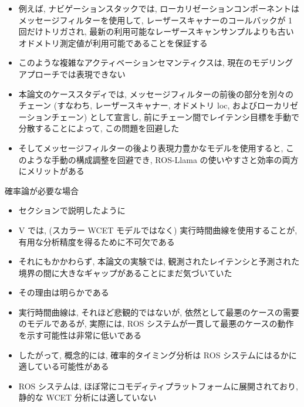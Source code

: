 \begin{frame}{}
    \begin{itemize}
        \item 例えば, ナビゲーションスタックでは, ローカリゼーションコンポーネントはメッセージフィルターを使用して, レーザースキャナーのコールバックが 1 回だけトリガされ, 最新の利用可能なレーザースキャンサンプルよりも古いオドメトリ測定値が利用可能であることを保証する
\item このような複雑なアクティベーションセマンティクスは, 現在のモデリングアプローチでは表現できない
\item 本論文のケーススタディでは, メッセージフィルターの前後の部分を別々のチェーン (すなわち, レーザースキャナー, オドメトリ loc, およびローカリゼーションチェーン) として宣言し, 前にチェーン間でレイテンシ目標を手動で分散することによって, この問題を回避した
\item そしてメッセージフィルターの後より表現力豊かなモデルを使用すると, このような手動の構成調整を回避でき, ROS-Llama の使いやすさと効率の両方にメリットがある
    \end{itemize}
\end{frame}

\begin{frame}{確率論が必要な場合}
    \begin{itemize}
        \item セクションで説明したように
\item V では, (スカラー WCET モデルではなく) 実行時間曲線を使用することが, 有用な分析精度を得るために不可欠である
\item それにもかかわらず, 本論文の実験では, 観測されたレイテンシと予測された境界の間に大きなギャップがあることにまだ気づいていた
    \end{itemize}
\end{frame}

\begin{frame}{}
    \begin{itemize}
        \item その理由は明らかである
\item 実行時間曲線は, それほど悲観的ではないが, 依然として最悪のケースの需要のモデルであるが, 実際には, ROS システムが一貫して最悪のケースの動作を示す可能性は非常に低いである
\item したがって, 概念的には, 確率的タイミング分析は ROS システムにはるかに適している可能性がある
\item ROS システムは, ほぼ常にコモディティプラットフォームに展開されており, 静的な WCET 分析には適していない
    \end{itemize}
\end{frame}


